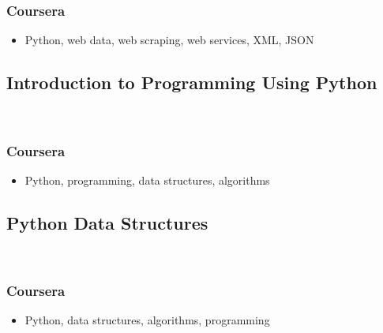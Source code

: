 \documentclass[12pt]{article}
\begin{document}
\subsubsection{Coursera}
\begin{itemize}
    \item[\textbullet]Python, web data, web scraping, web services, XML, JSON
\end{itemize}
\subsection{Introduction to Programming Using Python \hfill {}} \\ \smallskip
\subsubsection{Coursera}
\begin{itemize}
    \item[\textbullet] Python, programming, data structures, algorithms
\end{itemize}
\subsection{Python Data Structures \hfill {}} \\ \smallskip
\subsubsection{Coursera}
\begin{itemize}
    \item[\textbullet] Python, data structures, algorithms, programming
\end{itemize}
\end{document}
